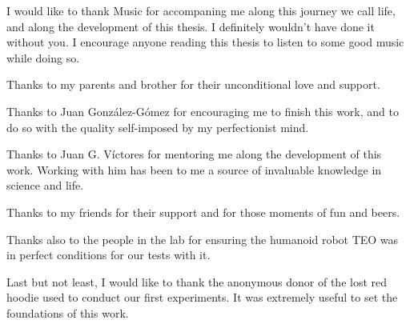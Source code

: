 I would like to thank Music for accompaning me along this journey we call life, and along the development of this thesis. I definitely wouldn't have done it without you. I encourage anyone reading this thesis to listen to some good music while doing so.

Thanks to my parents and brother for their unconditional love and support.

Thanks to Juan González-Gómez for encouraging me to finish this work, and to do so with the quality self-imposed by my perfectionist mind.

Thanks to Juan G. Víctores for mentoring me along the development of this work. Working with him has been to me a source of invaluable knowledge in science and life.

Thanks to my friends for their support and for those moments of fun and beers.

Thanks also to the people in the lab for  ensuring the humanoid robot TEO was in perfect conditions for our tests with it.

Last but not least, I would like to thank the anonymous donor of the lost red hoodie used to conduct our first experiments. It was extremely useful to set the foundations of this work.